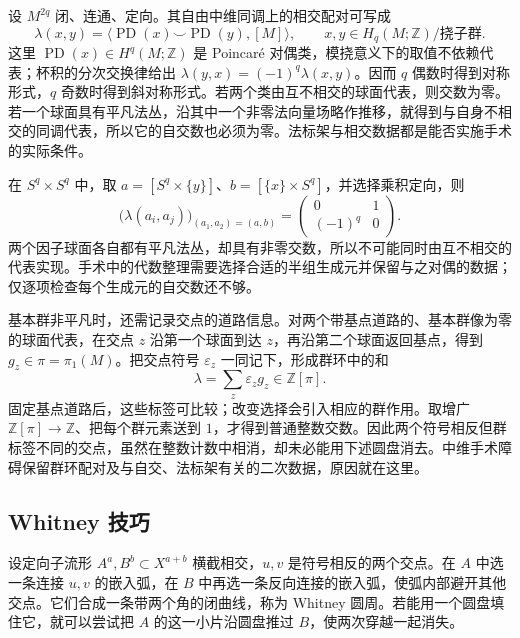 \ProseParagraphBreak

设 \(M^{2q}\) 闭、连通、定向。其自由中维同调上的相交配对可写成
\[
	\lambda(x,y)=\bigl\langle\operatorname{PD}(x)\smile\operatorname{PD}(y),[M]\bigr\rangle,
	\qquad x,y\in H_q(M;\mathbb Z)/\text{挠子群}.
\]
这里 \(\operatorname{PD}(x)\in H^q(M;\mathbb Z)\) 是 Poincar\'e 对偶类，模挠意义下的取值不依赖代表；杯积的分次交换律给出 \(\lambda(y,x)=(-1)^q\lambda(x,y)\)。因而 \(q\) 偶数时得到对称形式，\(q\) 奇数时得到斜对称形式。若两个类由互不相交的球面代表，则交数为零。若一个球面具有平凡法丛，沿其中一个非零法向量场略作推移，就得到与自身不相交的同调代表，所以它的自交数也必须为零。法标架与相交数据都是能否实施手术的实际条件。

\begin{example}\label{g2:exm:surgery-hyperbolic-pair}
	在 \(S^q\times S^q\) 中，取 \(a=[S^q\times\{y\}]\)、\(b=[\{x\}\times S^q]\)，并选择乘积定向，则
	\[
		\bigl(\lambda(a_i,a_j)\bigr)_{(a_1,a_2)=(a,b)}
		=\begin{pmatrix}0&1\\(-1)^q&0\end{pmatrix}.
	\]
	两个因子球面各自都有平凡法丛，却具有非零交数，所以不可能同时由互不相交的代表实现。手术中的代数整理需要选择合适的半组生成元并保留与之对偶的数据；仅逐项检查每个生成元的自交数还不够。
\end{example}

基本群非平凡时，还需记录交点的道路信息。对两个带基点道路的、基本群像为零的球面代表，在交点 \(z\) 沿第一个球面到达 \(z\)，再沿第二个球面返回基点，得到 \(g_z\in\pi=\pi_1(M)\)。把交点符号 \(\varepsilon_z\) 一同记下，形成群环中的和
\[
	\lambda=\sum_z\varepsilon_z g_z\in\mathbb Z[\pi].
\]
固定基点道路后，这些标签可比较；改变选择会引入相应的群作用。取增广 \(\mathbb Z[\pi]\to\mathbb Z\)、把每个群元素送到 \(1\)，才得到普通整数交数。因此两个符号相反但群标签不同的交点，虽然在整数计数中相消，却未必能用下述圆盘消去。中维手术障碍保留群环配对及与自交、法标架有关的二次数据，原因就在这里。

\subsection{Whitney 技巧}
\label{g2:subsec:2303:03}
设定向子流形 \(A^a,B^b\subset X^{a+b}\) 横截相交，\(u,v\) 是符号相反的两个交点。在 \(A\) 中选一条连接 \(u,v\) 的嵌入弧，在 \(B\) 中再选一条反向连接的嵌入弧，使弧内部避开其他交点。它们合成一条带两个角的闭曲线，称为 Whitney 圆周。若能用一个圆盘填住它，就可以尝试把 \(A\) 的这一小片沿圆盘推过 \(B\)，使两次穿越一起消失。


